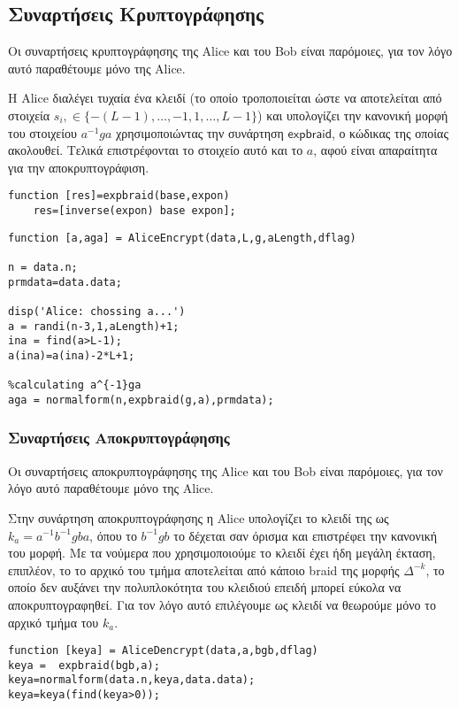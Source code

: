 \documentclass[a4paper,11pt]{article}
\newcommand\ntext[1]{\ensuremath{\mathsf{#1}}}
\begin{document}
\subsection{Συναρτήσεις Κρυπτογράφησης}

Οι συναρτήσεις κρυπτογράφησης της Alice και του Bob είναι παρόμοιες, για τον λόγο αυτό παραθέτουμε μόνο της Alice.

Η Alice διαλέγει τυχαία ένα κλειδί (το οποίο τροποποιείται ώστε να αποτελείται από στοιχεία $ s_i,\in \{ -(L-1),\dots,-1,1,\dots,L-1 \} $) και υπολογίζει την κανονική μορφή του στοιχείου $ a^{-1}ga $ χρησιμοποιώντας την συνάρτηση \ntext{expbraid}, ο κώδικας της οποίας ακολουθεί. Τελικά επιστρέφονται το στοιχείο αυτό και το $ a $, αφού είναι απαραίτητα για την αποκρυπτογράφιση.

\begin{lstlisting}
function [res]=expbraid(base,expon)
    res=[inverse(expon) base expon];
\end{lstlisting}

\begin{lstlisting}
function [a,aga] = AliceEncrypt(data,L,g,aLength,dflag)

n = data.n;
prmdata=data.data;

disp('Alice: chossing a...')
a = randi(n-3,1,aLength)+1;
ina = find(a>L-1);
a(ina)=a(ina)-2*L+1;

%calculating a^{-1}ga
aga = normalform(n,expbraid(g,a),prmdata);
\end{lstlisting}  

\subsubsection{Συναρτήσεις Αποκρυπτογράφησης}

Οι συναρτήσεις αποκρυπτογράφησης της Alice και του Bob είναι παρόμοιες, για τον λόγο αυτό παραθέτουμε μόνο της Alice.

Στην συνάρτηση αποκρυπτογράφησης η Alice υπολογίζει το κλειδί της ως $ k_a = a^{-1}b^{-1}gba $, όπου το $b^{-1}gb$ το δέχεται σαν όρισμα και επιστρέφει την κανονική του μορφή. Με τα νούμερα που χρησιμοποιούμε το κλειδί έχει ήδη μεγάλη έκταση, επιπλέον, το το αρχικό του τμήμα αποτελείται από κάποιο braid της μορφής $ \Delta^{-k} $, το οποίο δεν αυξάνει την πολυπλοκότητα του κλειδιού επειδή μπορεί εύκολα να αποκρυπτογραφηθεί. Για τον λόγο αυτό επιλέγουμε ως κλειδί να θεωρούμε μόνο το αρχικό τμήμα του $ k_a $.
\begin{lstlisting}
function [keya] = AliceDencrypt(data,a,bgb,dflag)
keya =  expbraid(bgb,a);
keya=normalform(data.n,keya,data.data);
keya=keya(find(keya>0));
\end{lstlisting}
\end{document}

